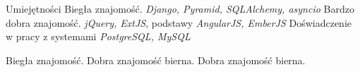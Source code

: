 \begin{rubric}{Umiejętności}
\entry*[Python]
	Biegła znajomość.\newline
    \textit{Django, Pyramid, SQLAlchemy, asyncio}
\entry*[JavaScript]
	Bardzo dobra znajomość.\newline
    \textit{jQuery, ExtJS}, podstawy \textit{AngularJS, EmberJS}
    Doświadczenie w pracy z systemami \textit{PostgreSQL, MySQL}

\entry*[Angielski]
	Biegła znajomość.
\entry*[Rosyjski]
	Dobra znajomość bierna.
\entry*[Cerkiewnosłowiański]
	Dobra znajomość bierna.
\end{rubric}
